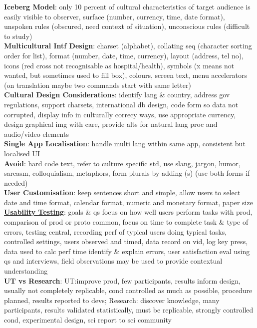 \documentclass[a4paper]{article}
\begin{document}
\begin{multicols}{3}
        \textbf{Iceberg Model}: only 10 percent of cultural characteristics of target audience is easily visible to observer, surface (number, currency, time, date format), unspoken rules (obscured, need context of situation), unconscious rules (difficult to study)\\
        \textbf{Multicultural Intf Design}: charset (alphabet), collating seq (character sorting order for list), format (number, date, time, currency), layout (address, tel no), icons (red cross not recognisable as hospital/health), symbols (x means not wanted, but sometimes used to fill box), colours, screen text, menu accelerators (on translation maybe two commands start with same letter)\\
        \textbf{Cultural Design Considerations}: identify lang \& country, address gov regulations, support charsets, international db design, code form so data not corrupted, display info in culturally correcy ways, use appropriate currency, design graphical img with care, provide alts for natural lang proc and audio/video elements\\
        \textbf{Single App Localisation}: handle multi lang within same app, consistent but localised UI\\
        \textbf{Avoid}: hard code text, refer to culture specific std, use slang, jargon, humor, sarcasm, colloquialism, metaphors, form plurals by adding (s) (use both forms if needed)\\
        \textbf{User Customisation}: keep sentences short and simple, allow users to select date and time format, calendar format, numeric and monetary format, paper size\\
        \underline{\textbf{Usability Testing}}: goals \& qs focus on how well users perform tasks with prod, comparison of prod or proto common, focus on time to complete task \& type of errors, testing central, recording perf of typical users doing typical tasks, controlled settings, users observed and timed, data record on vid, log key press, data used to calc perf time identify \& explain errors, user satisfaction eval using qs and interviews, field observations may be used to provide contextual understanding\\
        \textbf{UT vs Research}: UT:\@ improve prod, few participants, results inform design, usually not completely replicable, cond controlled as much as possible, procedure planned, results reported to devs; Research: discover knowledge, many participants, results validated statistically, must be replicable, strongly controlled cond, experimental design, sci report to sci community\\

\end{multicols}
\end{document}
